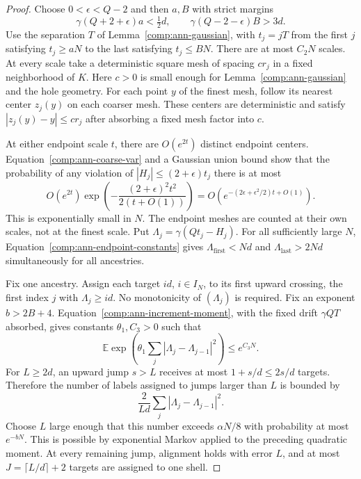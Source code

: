 \begin{proof}
Choose $0<\epsilon<Q-2$ and then $a,B$ with strict margins
\begin{equation}\label{comp:ann-endpoint-constants}
 \gamma(Q+2+\epsilon)a<\tfrac12d,
 \qquad \gamma(Q-2-\epsilon)B>3d.
\end{equation}
Use the separation $T$ of Lemma~\ref{comp:ann-gaussian}, with
$t_j=jT$ from the first $j$ satisfying $t_j\geq aN$ to the last
satisfying $t_j\leq BN$.  There are at most $C_2N$ scales.  At every
scale take a deterministic square mesh of spacing $cr_j$ in a fixed
neighborhood of $K$.  Here $c>0$ is small enough for
Lemma~\ref{comp:ann-gaussian} and the hole geometry.  For each point
$y$ of the finest mesh, follow its nearest center $z_j(y)$ on each
coarser mesh.  These centers are deterministic and satisfy
$|z_j(y)-y|\leq cr_j$ after absorbing a fixed mesh factor into $c$.

At either endpoint scale $t$, there are $O(e^{2t})$ distinct endpoint
centers.  Equation~\eqref{comp:ann-coarse-var} and a Gaussian union
bound show that the probability of any violation of
$|H_j|\leq(2+\epsilon)t_j$ there is at most
\[
 O(e^{2t})\exp\!\left(
      -\frac{(2+\epsilon)^2t^2}{2(t+O(1))}\right)
   =O\!\left(e^{-(2\epsilon+\epsilon^2/2)t+O(1)}\right).
\]
This is exponentially small in $N$.  The endpoint meshes are counted
at their own scales, not at the finest scale.  Put
$\Lambda_j=\gamma(Qt_j-H_j)$.  For all sufficiently large $N$,
Equation~\eqref{comp:ann-endpoint-constants} gives
$\Lambda_{\mathrm{first}}<Nd$ and $\Lambda_{\mathrm{last}}>2Nd$ simultaneously
for all ancestries.

Fix one ancestry.  Assign each target $id$, $i\in I_N$, to its first
upward crossing, the first index $j$ with $\Lambda_j\geq id$.  No monotonicity
of $(\Lambda_j)$ is required.  Fix an exponent $b>2B+4$.
Equation~\eqref{comp:ann-increment-moment}, with the fixed drift
$\gamma QT$ absorbed, gives constants $\theta_1,C_3>0$ such that
\[
 \mathbb E\exp\!\left(\theta_1\sum_j
                   |\Lambda_j-\Lambda_{j-1}|^2\right)\leq e^{C_3N}.
\]
For $L\geq2d$, an upward jump $s>L$ receives at most
$1+s/d\leq2s/d$ targets.  Therefore the number of labels assigned to
jumps larger than $L$ is bounded by
\begin{equation}\label{comp:ann-large-jump-loss}
 \frac{2}{Ld}\sum_j|\Lambda_j-\Lambda_{j-1}|^2.
\end{equation}
Choose $L$ large enough that this number exceeds $\alpha N/8$ with
probability at most $e^{-bN}$.  This is possible by exponential Markov
applied to the preceding quadratic moment.  At every remaining jump,
alignment holds with error $L$, and at most
$J=\lceil L/d\rceil+2$ targets are assigned to one shell.


\end{proof}
